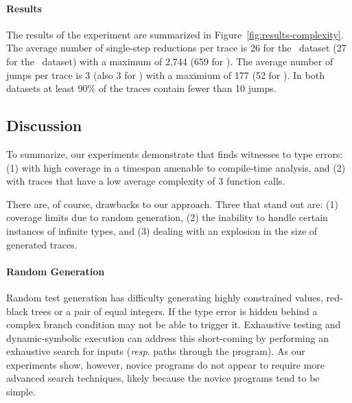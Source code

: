 \paragraph{Results}
\label{sec:results-complexity}
The results of the experiment are summarized in
Figure~\ref{fig:results-complexity}.
%
The average number of single-step reductions per trace is 26 for the \ucsdbench\
dataset (27 for the \uwbench\ dataset) with a maximum of 2,744 (659 for
\uwbench). The average number of jumps per trace is 3 (also 3 for
\uwbench) with a maximium of 177 (52 for \uwbench). In both datasets at
least 90\% of the traces contain fewer than 10 jumps.
%

\subsection{Discussion}
\label{sec:discussion}
To summarize, our experiments demonstrate that \nanomaly finds witnesses
to type errors: (1) with high coverage in a timespan amenable to
compile-time analysis, and (2) with traces that have a low average
complexity of 3 function calls.

There are, of course, drawbacks to our approach. Three that stand out
are: (1) coverage limits due to random generation, (2) the inability to
handle certain instances of infinite types, and (3) dealing with an
explosion in the size of generated traces.

\paragraph{Random Generation}
Random test generation has difficulty generating highly constrained
values, \eg red-black trees or a pair of equal integers. If the type
error is hidden behind a complex branch condition \nanomaly may not be
able to trigger it. Exhaustive testing and dynamic-symbolic execution
can address this short-coming by performing an exhaustive search for
inputs (\emph{resp}. paths through the program). As our experiments
show, however, novice programs do not appear to require more advanced
search techniques, likely because the novice programs tend to be simple.

